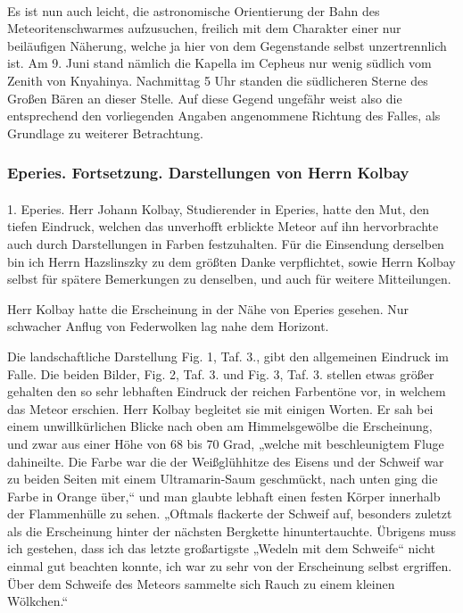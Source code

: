 \documentclass[a4paper, 11pt, oneside, german]{article}
\begin{document}
\paragraph{}
Es ist nun auch leicht, die astronomische Orientierung der Bahn des Meteoritenschwarmes aufzusuchen, freilich mit dem Charakter einer nur beiläufigen Näherung, welche ja hier von dem Gegenstande selbst unzertrennlich ist. Am 9. Juni stand nämlich die Kapella im Cepheus nur wenig südlich vom Zenith von Knyahinya. Nachmittag 5 Uhr standen die südlicheren Sterne des Großen Bären an dieser Stelle. Auf diese Gegend ungefähr weist also die entsprechend den vorliegenden Angaben angenommene Richtung des Falles, als Grundlage zu weiterer Betrachtung.
\clearpage
\subsubsection{Eperies. Fortsetzung. Darstellungen von Herrn Kolbay}
\paragraph{}
1. Eperies. Herr Johann Kolbay, Studierender in Eperies, hatte den Mut, den tiefen Eindruck, welchen das unverhofft erblickte Meteor auf ihn hervorbrachte auch durch Darstellungen in Farben festzuhalten. Für die Einsendung derselben bin ich Herrn Hazslinszky zu dem größten Danke verpflichtet, sowie Herrn Kolbay selbst für spätere Bemerkungen zu denselben, und auch für weitere Mitteilungen.

Herr Kolbay hatte die Erscheinung in der Nähe von Eperies gesehen. Nur schwacher Anflug von Federwolken lag nahe dem Horizont.

Die landschaftliche Darstellung Fig. 1, Taf. 3., gibt den allgemeinen Eindruck im Falle. Die beiden Bilder, Fig. 2, Taf. 3. und Fig. 3, Taf. 3. stellen etwas größer gehalten den so sehr lebhaften Eindruck der reichen Farbentöne vor, in welchem das Meteor erschien. Herr Kolbay begleitet sie mit einigen Worten. Er sah bei einem unwillkürlichen Blicke nach oben am Himmelsgewölbe die Erscheinung, und zwar aus einer Höhe von 68 bis 70 Grad, „welche mit beschleunigtem Fluge dahineilte. Die Farbe war die der Weißglühhitze des Eisens und der Schweif war zu beiden Seiten mit einem Ultramarin-Saum geschmückt, nach unten ging die Farbe in Orange über,“ und man glaubte lebhaft einen festen Körper innerhalb der Flammenhülle zu sehen. „Oftmals flackerte der Schweif auf, besonders zuletzt als die Erscheinung hinter der nächsten Bergkette hinuntertauchte. Übrigens muss ich gestehen, dass ich das letzte großartigste „Wedeln mit dem Schweife“ nicht einmal gut beachten konnte, ich war zu sehr von der Erscheinung selbst ergriffen. Über dem Schweife des Meteors sammelte sich Rauch zu einem kleinen Wölkchen.“
\end{document}
